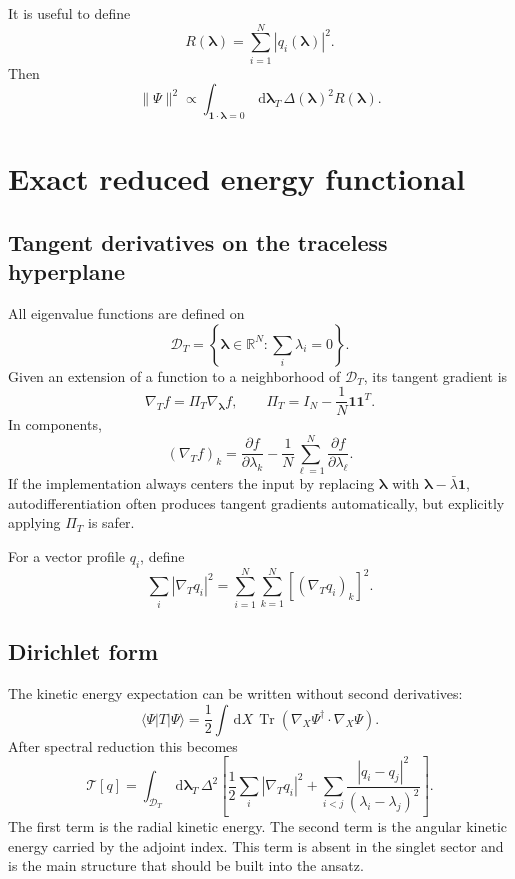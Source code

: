 \documentclass[11pt]{article}
\newcommand{\Tr}{\operatorname{Tr}}
\newcommand{\dd}{\,\mathrm d}
\newcommand{\R}{\mathbb R}
\newcommand{\calD}{\mathcal D}
\newcommand{\calT}{\mathcal T}
\newcommand{\gradT}{\nabla_{\!T}}
\newcommand{\projT}{\Pi_T}
\begin{document}
It is useful to define
\begin{equation}
R(\bm\lambda)=\sum_{i=1}^N |q_i(\bm\lambda)|^2.
\end{equation}
Then
\begin{equation}
\boxed{
\|\Psi\|^2
\propto
\int_{\bm 1\cdot\bm\lambda=0}\dd\bm\lambda_T\,
\Delta(\bm\lambda)^2R(\bm\lambda).
}
\label{eq:norm_reduced}
\end{equation}

\section{Exact reduced energy functional}

\subsection{Tangent derivatives on the traceless hyperplane}

All eigenvalue functions are defined on
\begin{equation}
\calD_T=\left\{\bm\lambda\in\R^N: \sum_i\lambda_i=0\right\}.
\end{equation}
Given an extension of a function to a neighborhood of $\calD_T$, its tangent gradient is
\begin{equation}
\boxed{
\gradT f=\projT\nabla_{\bm\lambda}f,
\qquad
\projT=I_N-\frac1N\bm 1\bm 1^T.
}
\label{eq:tangent_projector}
\end{equation}
In components,
\begin{equation}
(\gradT f)_k=\frac{\partial f}{\partial\lambda_k}
-\frac1N\sum_{\ell=1}^N\frac{\partial f}{\partial\lambda_\ell}.
\end{equation}
If the implementation always centers the input by replacing $\bm\lambda$ with $\bm\lambda-\bar\lambda\bm 1$, autodifferentiation often produces tangent gradients automatically, but explicitly applying $\projT$ is safer.

For a vector profile $q_i$, define
\begin{equation}
\sum_i |\gradT q_i|^2
=\sum_{i=1}^N\sum_{k=1}^N
\left[(\gradT q_i)_k\right]^2.
\end{equation}

\subsection{Dirichlet form}

The kinetic energy expectation can be written without second derivatives:
\begin{equation}
\langle\Psi|T|\Psi\rangle
=\frac12\int\dd X\,\Tr(\nabla_X\Psi^\dagger\cdot\nabla_X\Psi).
\end{equation}
After spectral reduction this becomes
\begin{equation}
\boxed{
\calT[q]=
\int_{\calD_T}\dd\bm\lambda_T\,\Delta^2
\left[
\frac12\sum_i |\gradT q_i|^2
+
\sum_{i<j}\frac{|q_i-q_j|^2}{(\lambda_i-\lambda_j)^2}
\right].
}
\label{eq:kinetic_reduced}
\end{equation}
The first term is the radial kinetic energy.  The second term is the angular kinetic energy carried by the adjoint index.  This term is absent in the singlet sector and is the main structure that should be built into the ansatz.
\end{document}
